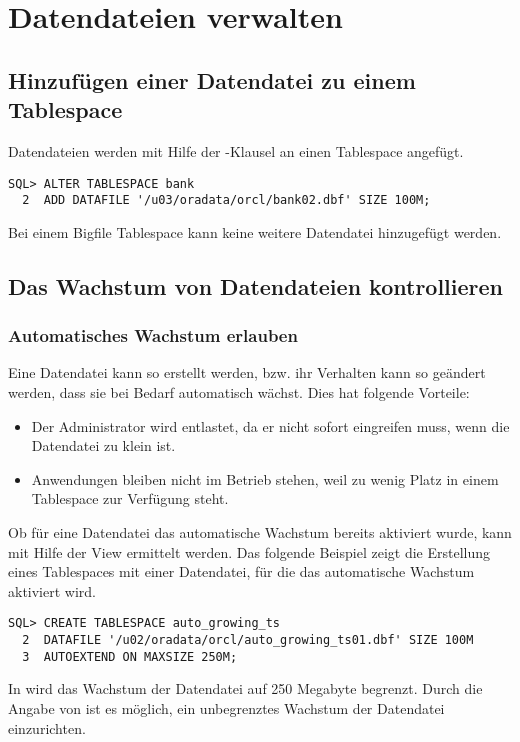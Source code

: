     \section{Datendateien verwalten}
      \subsection{Hinzufügen einer Datendatei zu einem Tablespace}
        Datendateien werden mit Hilfe der -Klausel an einen Tablespace angefügt.
        \begin{lstlisting}[caption={Hinzufügen einer Datendatei},label=admin122,language=oracle_sql]
SQL> ALTER TABLESPACE bank
  2  ADD DATAFILE '/u03/oradata/orcl/bank02.dbf' SIZE 100M;
        \end{lstlisting}
        \begin{merke}
          Bei einem Bigfile Tablespace kann keine weitere Datendatei hinzugefügt werden.
        \end{merke}
      \subsection{Das Wachstum von Datendateien kontrollieren}
        \subsubsection{Automatisches Wachstum erlauben}
          Eine Datendatei kann so erstellt werden, bzw. ihr Verhalten kann so geändert werden, dass sie bei Bedarf automatisch wächst. Dies hat folgende Vorteile:
          \begin{itemize}
            \item Der Administrator wird entlastet, da er nicht sofort eingreifen muss, wenn die Datendatei zu klein ist.
            \item Anwendungen bleiben nicht im Betrieb stehen, weil zu wenig Platz in einem Tablespace zur Verfügung steht.
          \end{itemize}
          Ob für eine Datendatei das automatische Wachstum bereits aktiviert wurde, kann mit Hilfe der View  ermittelt werden. Das folgende Beispiel zeigt die Erstellung eines Tablespaces mit einer Datendatei, für die das automatische Wachstum aktiviert wird.
          \begin{lstlisting}[caption={Erstellen eines Tablespaces mit automatisch wachsender Datendatei},label=admin123,language=oracle_sql]
SQL> CREATE TABLESPACE auto_growing_ts
  2  DATAFILE '/u02/oradata/orcl/auto_growing_ts01.dbf' SIZE 100M
  3  AUTOEXTEND ON MAXSIZE 250M;
          \end{lstlisting}
          In  wird das Wachstum der Datendatei auf 250 Megabyte begrenzt. Durch die Angabe von  ist es möglich, ein unbegrenztes Wachstum der Datendatei einzurichten.

